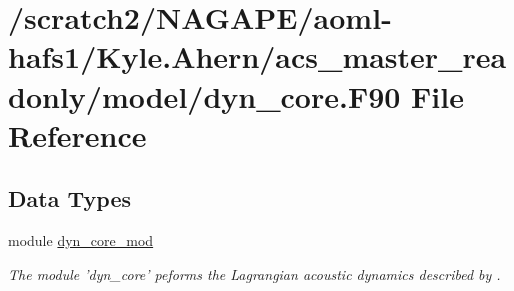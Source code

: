 \section{/scratch2/\-N\-A\-G\-A\-P\-E/aoml-\/hafs1/\-Kyle.Ahern/acs\-\_\-master\-\_\-readonly/model/dyn\-\_\-core.F90 File Reference}
\label{dyn__core_8F90}
\subsection*{Data Types}
\begin{DoxyCompactItemize}
\item 
module \hyperlink{classdyn__core__mod}{dyn\-\_\-core\-\_\-mod}
\begin{DoxyCompactList}\small\item\em The module 'dyn\-\_\-core' peforms the Lagrangian acoustic dynamics described by \cite{lin2004vertically}. \end{DoxyCompactList}\end{DoxyCompactItemize}
